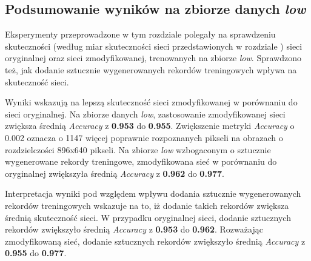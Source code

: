 \subsection{Podsumowanie wyników na zbiorze danych \textit{low}}
Eksperymenty przeprowadzone w tym rozdziale polegały na sprawdzeniu skuteczności (według miar skuteczności sieci przedstawionych w rozdziale ) sieci oryginalnej oraz sieci zmodyfikowanej, trenowanych na zbiorze \textit{low}.
Sprawdzono też, jak dodanie sztucznie wygenerowanych rekordów treningowych wpływa na skuteczność sieci.


Wyniki wskazują na lepszą skuteczność sieci zmodyfikowanej w porównaniu do sieci oryginalnej.
Na zbiorze danych \textit{low}, zastosowanie zmodyfikowanej sieci zwiększa średnią \textit{Accuracy} z \textbf{0.953} do \textbf{0.955}.
Zwiększenie metryki \textit{Accuracy} o 0.002 oznacza o 1147 więcej poprawnie rozpoznanych pikseli na obrazach o rozdzielczości 896x640 pikseli. Na zbiorze \textit{low} wzbogaconym o sztucznie wygenerowane rekordy treningowe, zmodyfikowana sieć w porównaniu do oryginalnej zwiększyła średnią \textit{Accuracy} z \textbf{0.962} do \textbf{0.977}.


Interpretacja wyniki pod względem wpływu dodania sztucznie wygenerowanych rekordów treningowych wskazuje na to, iż dodanie takich rekordów zwiększa średnią skuteczność sieci. W przypadku oryginalnej sieci, dodanie sztucznych rekordów zwiększyło średnią \textit{Accuracy} z \textbf{0.953} do \textbf{0.962}. Rozważając zmodyfikowaną sieć, dodanie sztucznych rekordów zwiększyło średnią \textit{Accuracy} z \textbf{0.955} do \textbf{0.977}.
